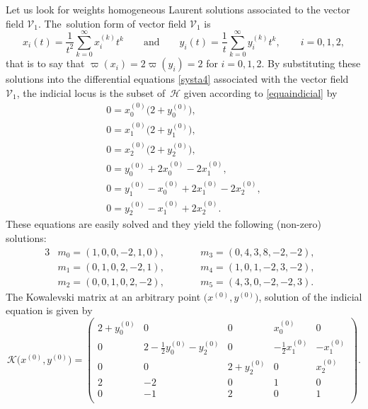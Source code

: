 \documentclass[10pt,a4paper]{amsart}
\numberwithin{equation}{section}
\begin{document}
Let us look for weights homogeneous Laurent solutions associated to
the vector field $\mathcal{V}_1$. The~solution form of vector field
$\mathcal{V}_1$ is
\[x_i(t)=\frac{1}{t^{2}}\sum_{k=0}^\infty x_i
^{(k)}t^k \qquad \text{and} \qquad
y_i(t)=\frac{1}{t}\sum_{k=0}^\infty
y_i^{(k)}t^k, \qquad i=0,1,2,\]
that is to say
that $\varpi(x_i)=2\varpi(y_i)=2$ for $i=0,1,
$2. By substituting these solutions into the differential equations
\eqref{systa4} associated with the vector field $\mathcal{V}_1$, the
indicial locus is the subset of~$\mathcal{H}$ given according to
\eqref{equaindicial} by
\begin{gather*}
 0 = x_0^{(0)}\bigl(2+y_0^{(0)}\bigr), \\
 0 = x_1^{(0)}\bigl(2+y_1^{(0)}\bigr),\\
 0 = x_2^{(0)}\bigl(2+y_2^{(0)}\bigr), \\
 0 = y_0^{(0)}+2x_0^{(0)}-2x_1^{(0)},\\
 0 = y_1^{(0)}-x_0^{(0)}+2x_1^{(0)}-2x_2^{(0) } ,\\
 0 = y_2^{(0)}-x_1^{(0)}+2x_2^{(0)}.
\end{gather*}
These equations are easily solved and they yield the following
(non-zero) solutions:
 \begin{alignat*}{3}
& m_0= (1,0,0,-2,1,0), \qquad && m_3= (0,4,3,8,-2,-2), &\\
& m_1= (0,1,0,2,-2,1), \qquad && m_4= (1,0,1,-2,3,-2), &\\
& m_2= (0,0,1,0,2,-2), \qquad && m_5= (4,3,0,-2,-2,3).&
 \end{alignat*}
 The Kowalevski matrix at an arbitrary point
$\bigl(x^{(0)},y^{(0)}\bigr)$,
 solution of the indicial equation is given by
 \[\mathcal{K}\bigl(x^{(0)},y^{(0)}\bigr)
 =\begin{pmatrix}
 2+ y_0^{(0)}& 0 & 0 & x_0^{(0)} & 0 \\
 0 & 2- \frac{1}{2}y_0^{(0)}-y_2^{(0)}& 0 &-\frac{1}{2}x_1^{ (0)} & -x_1^{(0)} \\[1mm]
 0 & 0 & 2+ y_2^{(0)} & 0 & x_2^{(0)}\\
 2 & -2 & 0 & 1 & 0 \\
 0 & -1 & 2 & 0 & 1 \\
 \end{pmatrix}.\]
\end{document}
